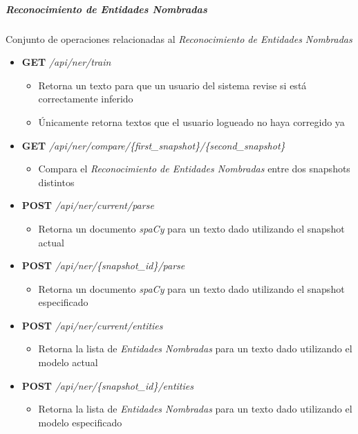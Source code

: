 \documentclass[12pt,a4paper,]{scrartcl}
\providecommand{\tightlist}{%
  \setlength{\itemsep}{0pt}\setlength{\parskip}{0pt}}
\let\oldsubparagraph\subparagraph
\renewcommand{\subparagraph}[1]{\oldsubparagraph{#1}\mbox{}}
\begin{document}
\hypertarget{reconocimiento-de-entidades-nombradas}{%
\subparagraph{Reconocimiento de Entidades Nombradas}\label{reconocimiento-de-entidades-nombradas}}

Conjunto de operaciones relacionadas al \emph{Reconocimiento de Entidades Nombradas}

\begin{itemize}
\tightlist
\item
  \textbf{GET} \emph{/api/ner/train}

  \begin{itemize}
  \tightlist
  \item
    Retorna un texto para que un usuario del sistema revise si está correctamente inferido
  \item
    Únicamente retorna textos que el usuario logueado no haya corregido ya
  \end{itemize}
\item
  \textbf{GET} \emph{/api/ner/compare/\{first\_snapshot\}/\{second\_snapshot\}}

  \begin{itemize}
  \tightlist
  \item
    Compara el \emph{Reconocimiento de Entidades Nombradas} entre dos snapshots distintos
  \end{itemize}
\item
  \textbf{POST} \emph{/api/ner/current/parse}

  \begin{itemize}
  \tightlist
  \item
    Retorna un documento \emph{spaCy} para un texto dado utilizando el snapshot actual
  \end{itemize}
\item
  \textbf{POST} \emph{/api/ner/\{snapshot\_id\}/parse}

  \begin{itemize}
  \tightlist
  \item
    Retorna un documento \emph{spaCy} para un texto dado utilizando el snapshot especificado
  \end{itemize}
\item
  \textbf{POST} \emph{/api/ner/current/entities}

  \begin{itemize}
  \tightlist
  \item
    Retorna la lista de \emph{Entidades Nombradas} para un texto dado utilizando el modelo actual
  \end{itemize}
\item
  \textbf{POST} \emph{/api/ner/\{snapshot\_id\}/entities}

  \begin{itemize}
  \tightlist
  \item
    Retorna la lista de \emph{Entidades Nombradas} para un texto dado utilizando el modelo especificado
  \end{itemize}
\end{itemize}
\end{document}
